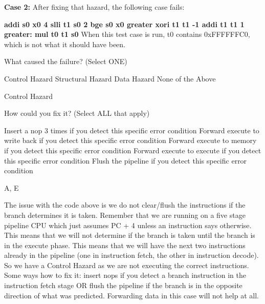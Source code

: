 \begin{blocksection}
\textbf{Case 2:} After fixing that hazard, the following case fails:

\textbf{addi s0 x0 4
\newline
\hspace{10mm} slli t1 s0 2
\newline
\hspace{10mm} bge s0 x0 greater
\newline
\hspace{10mm} xori t1 t1 -1
\newline
\hspace{10mm} addi t1 t1 1
\newline
\hspace{10mm} greater:
\newline
\hspace{10mm} mul t0 t1 s0
\newline
}
\newline
When this test case is run, t0 contains 0xFFFFFFC0, which is not what it should have been.

\question 
What caused the failure? (Select ONE)
\begin{checkboxes}
 \choice Control Hazard
 \choice Structural Hazard
 \choice Data Hazard
 \choice None of the Above
\end{checkboxes}

\begin{solution}[0.5in]
Control Hazard
\end{solution}

\question
How could you fix it? (Select ALL that apply)
\begin{checkboxes}
 \choice Insert a nop 3 times if you detect this specific error condition
 \choice Forward execute to write back if you detect this specific error condition
 \choice Forward execute to memory if you detect this specific error condition
 \choice Forward execute to execute if you detect this specific error condition
 \choice Flush the pipeline if you detect this specific error condition
\end{checkboxes}

\begin{solution}[0.5in]
A, E
\end{solution}

\begin{solution}[0.5in]
The issue with the code above is we do not clear/flush the instructions if the branch determines it is taken.
Remember that we are running on a five stage pipeline CPU which just assumes PC + 4 unless an instruction
says otherwise. This means that we will not determine if the branch is taken until the branch is in the execute
phase. This means that we will have the next two instructions already in the pipeline (one in instruction fetch,
the other in instruction decode). So we have a Control Hazard as we are not executing the correct instructions.
Some ways how to fix it: insert nops if you detect a branch instruction in the instruction fetch stage OR flush
the pipeline if the branch is in the opposite direction of what was predicted. Forwarding data in this case will not
help at all.
\end{solution}
\end{blocksection}